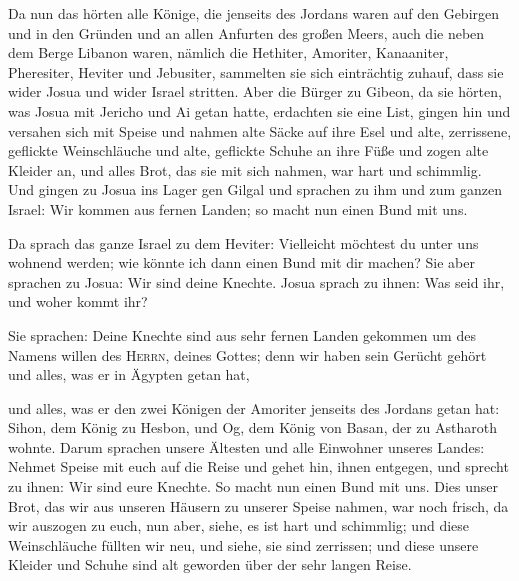  Da nun das hörten alle Könige, die jenseits des Jordans
waren auf den Gebirgen und in den Gründen und an allen Anfurten des
großen Meers, auch die neben dem Berge Libanon waren, nämlich die
Hethiter, Amoriter, Kanaaniter, Pheresiter, Heviter und Jebusiter,
 sammelten sie sich einträchtig zuhauf, dass sie wider
Josua und wider Israel stritten.  Aber die Bürger zu
Gibeon, da sie hörten, was Josua mit Jericho und Ai getan hatte,
erdachten sie eine List,  gingen hin und versahen sich mit
Speise und nahmen alte Säcke auf ihre Esel  und alte,
zerrissene, geflickte Weinschläuche und alte, geflickte Schuhe an ihre
Füße und zogen alte Kleider an, und alles Brot, das sie mit sich nahmen,
war hart und schimmlig.  Und gingen zu Josua ins Lager gen
Gilgal und sprachen zu ihm und zum ganzen Israel: Wir kommen aus fernen
Landen; so macht nun einen Bund mit uns.

 Da sprach das ganze Israel zu dem Heviter: Vielleicht
möchtest du unter uns wohnend werden; wie könnte ich dann einen Bund mit
dir machen?  Sie aber sprachen zu Josua: Wir sind deine
Knechte. Josua sprach zu ihnen: Was seid ihr, und woher kommt ihr?

 Sie sprachen: Deine Knechte sind aus sehr fernen Landen
gekommen um des Namens willen des \textsc{Herrn}, deines Gottes; denn
wir haben sein Gerücht gehört und alles, was er in Ägypten getan hat,

 und alles, was er den zwei Königen der Amoriter jenseits
des Jordans getan hat: Sihon, dem König zu Hesbon, und Og, dem König von
Basan, der zu Astharoth wohnte.  Darum sprachen unsere
Ältesten und alle Einwohner unseres Landes: Nehmet Speise mit euch auf
die Reise und gehet hin, ihnen entgegen, und sprecht zu ihnen: Wir sind
eure Knechte. So macht nun einen Bund mit uns.  Dies
unser Brot, das wir aus unseren Häusern zu unserer Speise nahmen, war
noch frisch, da wir auszogen zu euch, nun aber, siehe, es ist hart und
schimmlig;  und diese Weinschläuche füllten wir neu, und
siehe, sie sind zerrissen; und diese unsere Kleider und Schuhe sind alt
geworden über der sehr langen Reise.

